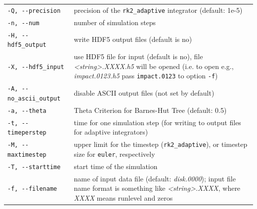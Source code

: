 \documentclass[10pt,fleqn,twoside]{article}
\begin{document}
\begin{table}
\begin{tabular}[b]{p{5cm} p{9cm}}
  \verb|-Q, --precision| & precision of the \verb|rk2_adaptive| integrator (default: 1e-5)                                                                                                                                      \\
  \verb|-n, --num| & number of simulation steps                                                                                                                                                                               \\
  \verb|-H, --hdf5_output| & write HDF5 output files (default is no)                                                                                                                                                                  \\
  \verb|-X, --hdf5_input| & use HDF5 file for input (default is no), file \emph{<string>.XXXX.h5} will be opened (i.e. to open e.g., \emph{impact.0123.h5} pass \verb|impact.0123| to option \verb|-f|)           \\
  \verb|-A, --no_ascii_output| & disable ASCII output files (not set by default)                                                                                                                                                          \\
  \verb|-a, --theta| & Theta Criterion for Barnes-Hut Tree (default: 0.5)                                                                                                                                                       \\
  \verb|-t, --timeperstep| & time for one simulation step (for writing to output files for adaptive integrators)                                                                                                                      \\
  \verb|-M, --maxtimestep| & upper limit for the timestep (\verb|rk2_adaptive|), or timestep size for \verb|euler|, respectively                                                                                       \\
  \verb|-T, --starttime| & start time of the simulation                                                                                                                                                                             \\
  \verb|-f, --filename| & name of input data file (default: \emph{disk.0000}); input file name format is something like \emph{<string>.XXXX}, where \emph{XXXX} means runlevel and zeros                                           \\

\end{tabular}
\end{table}
\end{document}

